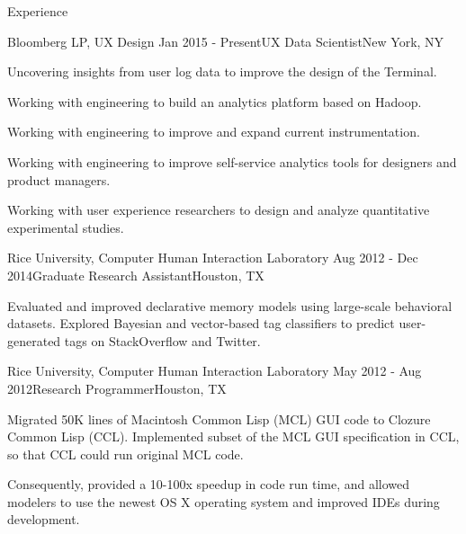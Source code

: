 
\begin{rSection}{Experience}

  \begin{rSubsection}{Bloomberg LP, UX Design}
    {Jan 2015 - Present}{UX Data Scientist}{New York, NY}
  \item Uncovering insights from user log data to improve the design of the Terminal.
  \item Working with engineering to build an analytics platform based on Hadoop.
  \item Working with engineering to improve and expand current instrumentation.
  \item Working with engineering to improve self-service analytics tools for designers and product managers.
  \item Working with user experience researchers to design and analyze quantitative experimental studies.
  \end{rSubsection}

  \begin{rSubsection}{Rice University, Computer Human Interaction Laboratory}
    {Aug 2012 - Dec 2014}{Graduate Research Assistant}{Houston, TX}
  \item Evaluated and improved declarative memory models using large-scale behavioral datasets.
    Explored Bayesian and vector-based tag classifiers to predict user-generated tags on StackOverflow and Twitter.
  \end{rSubsection}

  \begin{rSubsection}{Rice University, Computer Human Interaction Laboratory}
    {May 2012 - Aug 2012}{Research Programmer}{Houston, TX}
  \item Migrated 50K lines of Macintosh Common Lisp (MCL) GUI code to Clozure Common Lisp (CCL).
    Implemented subset of the MCL GUI specification in CCL, so that CCL could run original MCL code.
  \item Consequently, provided a 10-100x speedup in code run time, and allowed modelers to use the newest OS X operating system and improved IDEs during development.
  \end{rSubsection}


\end{rSection}
